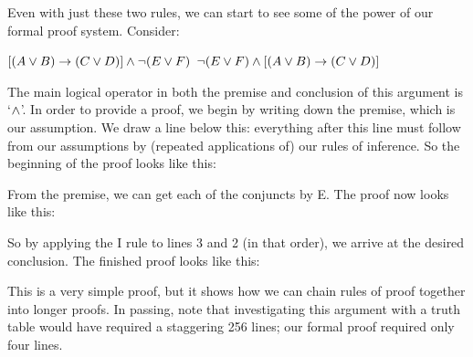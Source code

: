Even with just these two rules, we can start to see some of the power of our formal proof system. Consider:
\begin{earg}
\prem $[(A\vee B)\rightarrow(C\vee D)] \mathbin{\wedge} \neg(E\vee F)$
\conc $\neg(E\vee F) \mathbin{\wedge} [(A\vee B)\rightarrow(C\vee D)]$
\end{earg}
The main logical operator in both the premise and conclusion of this argument is `$\mathbin{\wedge}$'. In order to provide a proof, we begin by writing down the premise, which is our assumption. We draw a line below this: everything after this line must follow from our assumptions by (repeated applications of) our rules of inference. So the beginning of the proof looks like this:
\begin{fitchproof}
\end{fitchproof}
From the premise, we can get each of the conjuncts by {\eand}E. The proof now looks like this:
\begin{fitchproof}
	 
	 
\end{fitchproof}
So by applying the {\eand}I rule to lines 3 and 2 (in that order), we arrive at the desired conclusion. The finished proof looks like this:
\begin{fitchproof}

	 
	 
	 
\end{fitchproof}
This is a very simple proof, but it shows how we can chain rules of proof together into longer proofs. In passing, note that investigating this argument with a truth table would have required a staggering 256 lines; our formal proof required only four lines.

